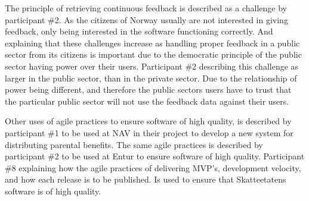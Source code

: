 The principle of retrieving continuous feedback is described as a challenge by participant \#2. As the citizens of Norway usually are not interested in giving feedback, only being interested in the software functioning correctly. And explaining that these challenges increase as handling proper feedback in a public sector from its citizens is important due to the democratic principle of the public sector having power over their users. Participant \#2 describing this challenge as larger in the public sector, than in the private sector. Due to the relationship of power being different, and therefore the public sectors users have to trust that the particular public sector will not use the feedback data against their users.


Other uses of agile practices to ensure software of high quality, is described by participant \#1 to be used at NAV in their project to develop a new system for distributing parental benefits. The same agile practices is described by participant \#2 to be used at Entur to ensure software of high quality. Participant \#8 explaining how the agile practices of delivering MVP's, development velocity, and how each release is to be published. Is used to ensure that Skatteetatens software is of high quality.



